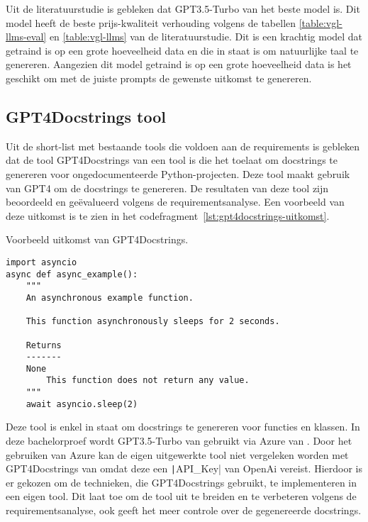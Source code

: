 Uit de literatuurstudie is gebleken dat GPT3.5-Turbo van \textcite{OpenAi2024} het beste model is. 
Dit model heeft de beste prijs-kwaliteit verhouding volgens de tabellen \ref{table:vgl-llms-eval} en \ref{table:vgl-llms} van de literatuurstudie.
Dit is een krachtig model dat getraind is op een grote hoeveelheid data en die in staat is om natuurlijke taal te genereren.
Aangezien dit model getraind is op een grote hoeveelheid data is het geschikt om met de juiste prompts de gewenste uitkomst te genereren.


\subsection{GPT4Docstrings tool}
\label{sec:bestanddocumentatie-tool}
Uit de short-list met bestaande tools die voldoen aan de requirements is gebleken dat de tool GPT4Docstrings van \textcite{Trofficus2023} een tool is die het toelaat om docstrings te genereren voor ongedocumenteerde Python-projecten.
Deze tool maakt gebruik van GPT4 \autocite{OpenAI2023} om de docstrings te genereren.
De resultaten van deze tool zijn beoordeeld en geëvalueerd volgens de requirementsanalyse. Een voorbeeld van deze uitkomst is te zien in het codefragment~\ref{lst:gpt4docstrings-uitkomst}.

\begin{listing}
    \caption{Voorbeeld uitkomst van GPT4Docstrings. \autocite{Trofficus2023}}
    \label{lst:gpt4docstrings-uitkomst}
    \begin{verbatim}
import asyncio
async def async_example():
    """
    An asynchronous example function.

    This function asynchronously sleeps for 2 seconds.

    Returns
    -------
    None
        This function does not return any value.
    """
    await asyncio.sleep(2)
    \end{verbatim}
\end{listing}

Deze tool is enkel in staat om docstrings te genereren voor functies en klassen.
In deze bachelorproef wordt GPT3.5-Turbo van \textcite{OpenAi2024} gebruikt via Azure van \textcite{Microsoft2024}.
Door het gebruiken van Azure kan de eigen uitgewerkte tool niet vergeleken worden met GPT4Docstrings van \textcite{Trofficus2023} omdat deze een \texttt|API_Key| van OpenAi \autocite{OpenAi2024} vereist.
Hierdoor is er gekozen om de technieken, die GPT4Docstrings gebruikt, te implementeren in een eigen tool.
Dit laat toe om de tool uit te breiden en te verbeteren volgens de requirementsanalyse, ook geeft het meer controle over de gegenereerde docstrings.

